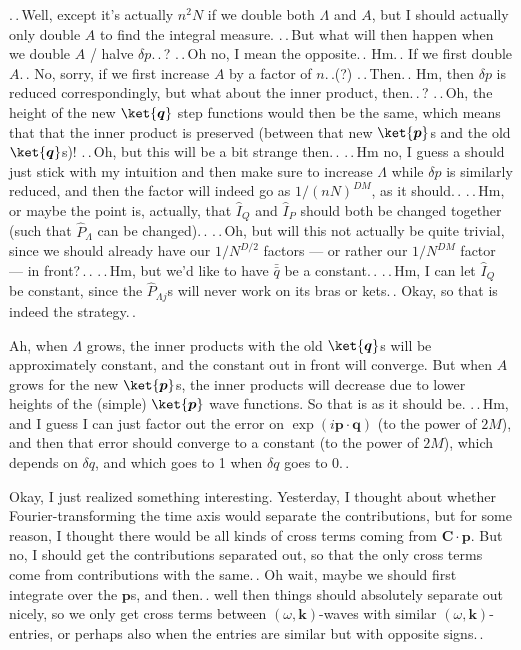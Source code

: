 \documentclass{report}
\begin{document}
.\,.\,Well, except it's actually $n^2 N$ if we double both $\Lambda$ and $A$, but I should actually only double $A$ to find the integral measure. .\,.\,But what will then happen when we double $A$ / halve $\delta p$.\,.\,? .\,.\,Oh no, I mean the opposite.\,. Hm.\,. If we first double $A$.\,. No, sorry, if we first increase $A$ by a factor of $n$.\,.(?) .\,.\,Then.\,. Hm, then $\delta p$ is reduced correspondingly, but what about the inner product, then.\,.\,? .\,.\,Oh, the height of the new $\ket{\boldsymbol{q}}$ step functions would then be the same, which means that that the inner product is preserved (between that new $\ket{\boldsymbol{p}}$s and the old $\ket{\boldsymbol{q}}$s)! .\,.\,Oh, but this will be a bit strange then.\,. .\,.\,Hm no, I guess a should just stick with my intuition and then make sure to increase $\Lambda$ while $\delta p$ is similarly reduced, and then the factor will indeed go as $1/(n N)^{D M}$, as it should.\,. %
.\,.\,Hm, or maybe the point is, actually, that $\hat I_Q$ and $\hat I_P$ should both be changed together (such that $\hat P_{\Lambda}$ can be changed).\,. .\,.\,Oh, but will this not actually be quite trivial, since we should already have our $1/N^{D/2}$ factors --- or rather our $1/N^{D M}$ factor --- in front?\,.\,. .\,.\,Hm, but we'd like to have $\bar{\bar{q}}$ be a constant.\,. .\,.\,Hm, I can let $\hat I_Q$ be constant, since the $\hat P_{\Lambda j}$s will never work on its bras or kets.\,. Okay, so that is indeed the strategy.\,. 

Ah, when $\Lambda$ grows, the inner products with the old $\ket{\boldsymbol{q}}$s will be approximately constant, and the constant out in front will converge. But when $A$ grows for the new $\ket{\boldsymbol{p}}$s, the inner products will decrease due to lower heights of the (simple) $\ket{\boldsymbol{p}}$ wave functions. So that is as it should be. .\,.\,Hm, and I guess I can just factor out the error on $\exp(i \boldsymbol{p} \cdot \boldsymbol{q})$ (to the power of $2M$), and then that error should converge to a constant (to the power of $2M$), which depends on $\delta q$, and which goes to 1 when $\delta q$ goes to 0.\,.

Okay, I just realized something interesting. Yesterday, I thought about whether Fourier-transforming the time axis would separate the contributions, but for some reason, I thought there would be all kinds of cross terms coming from $\boldsymbol{C} \cdot \boldsymbol{p}$. But no, I should get the contributions separated out, so that the only cross terms come from contributions with the same.\,. Oh wait, maybe we should first integrate over the $\boldsymbol{p}$s, and then.\,. well then things should absolutely separate out nicely, so we only get cross terms between $(\omega, \boldsymbol{k})$-waves with similar $(\omega, \boldsymbol{k})$-entries, or perhaps also when the entries are similar but with opposite signs.\,. 
\end{document}
